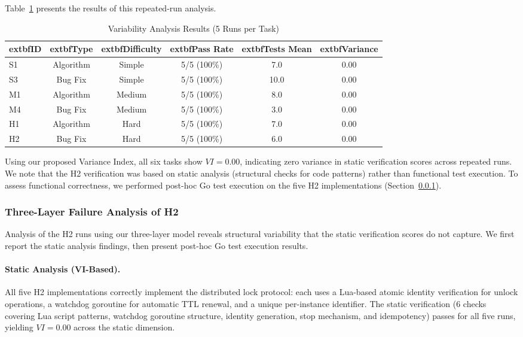 \documentclass[conference]{IEEEtran}
\begin{document}
Table~\ref{tab:variability} presents the results of this repeated-run analysis.

\begin{table}[h]
\centering
\caption{Variability Analysis Results (5 Runs per Task)}
\label{tab:variability}
\small
\begin{tabular}{@{}lccccc@{}}
\toprule
			extbf{ID} & 			extbf{Type} & 			extbf{Difficulty} & 			extbf{Pass Rate} & 			extbf{Tests Mean} & 			extbf{Variance} \\
\midrule
S1 & Algorithm & Simple & 5/5 (100\%) & 7.0 & 0.00 \\
S3 & Bug Fix & Simple & 5/5 (100\%) & 10.0 & 0.00 \\
M1 & Algorithm & Medium & 5/5 (100\%) & 8.0 & 0.00 \\
M4 & Bug Fix & Medium & 5/5 (100\%) & 3.0 & 0.00 \\
H1 & Algorithm & Hard & 5/5 (100\%) & 7.0 & 0.00 \\
H2 & Bug Fix & Hard & 5/5 (100\%) & 6.0 & 0.00 \\
\bottomrule
\end{tabular}
\end{table}

Using our proposed Variance Index, all six tasks show $VI = 0.00$, indicating zero variance in static verification scores across repeated runs. We note that the H2 verification was based on static analysis (structural checks for code patterns) rather than functional test execution. To assess functional correctness, we performed post-hoc Go test execution on the five H2 implementations (Section~\ref{sec:h2_detail}).

\subsubsection{Three-Layer Failure Analysis of H2}
\label{sec:h2_detail}
Analysis of the H2 runs using our three-layer model reveals structural variability that the static verification scores do not capture. We first report the static analysis findings, then present post-hoc Go test execution results.

\paragraph{Static Analysis (VI-Based).}
All five H2 implementations correctly implement the distributed lock protocol: each uses a Lua-based atomic identity verification for unlock operations, a watchdog goroutine for automatic TTL renewal, and a unique per-instance identifier. The static verification (6 checks covering Lua script patterns, watchdog goroutine structure, identity generation, stop mechanism, and idempotency) passes for all five runs, yielding $VI = 0.00$ across the static dimension.
\end{document}
